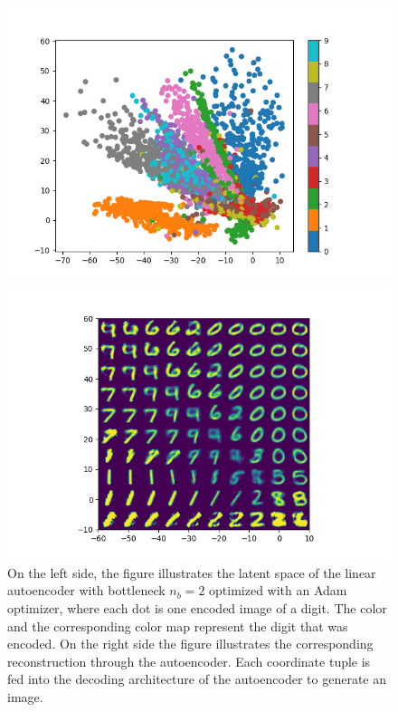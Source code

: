 \begin{figure}
\begin{center}
   \begin{minipage}[b]{0.49\linewidth}
      \includegraphics[trim = 15mm 5mm 15mm 10mm, clip, width=\linewidth]{linear_AE_2d_adam_latent}
	\end{minipage}
   \begin{minipage}[b]{0.49\linewidth}
      \includegraphics[trim = 15mm 5mm 15mm 10mm, clip, width=\linewidth]{linear_AE_2d_adam_reconstruction}
	\end{minipage}
\end{center}
\caption{On the left side, the figure illustrates the latent space of the linear autoencoder with bottleneck $n_b=2$ optimized with an Adam optimizer, where each dot is one encoded image of a digit. The color and the corresponding color map represent the digit that was encoded. On the right side the figure illustrates the corresponding reconstruction through the autoencoder. Each coordinate tuple is fed into the decoding architecture of the autoencoder to generate an image.}\label{fig:linear_AE_2d_adam_latent}
\end{figure}


